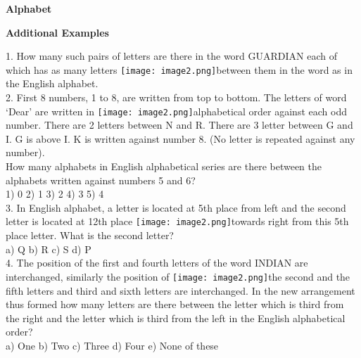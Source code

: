 \documentclass[
]{article}
\author{}
\date{}
\begin{document}
	
 

\begin{center}
	{\Large \textbf{Alphabet \\}}
\end{center}

{\large \textbf{ Additional Examples \\}}

1. How many such pairs of letters are there in the word GUARDIAN each of which has as many letters \texttt{[image: image2.png]}between them in the word as in the English alphabet.\\

2. First 8 numbers, 1 to 8, are written from top to bottom. The letters of word ‘Dear’ are written
in \texttt{[image: image2.png]}alphabetical order against each odd number. There are 2 letters between N and R. There
are 3 letter between G and I. G is above I. K is written against number 8. (No letter is
repeated against any number).\\
How many alphabets in English alphabetical series are there between the alphabets written
against numbers 5 and 6?\\
1) 0 \hspace{2mm}2) 1 \hspace{2mm}3) 2 \hspace{2mm}4) 3 \hspace{2mm}5) 4\\

3. In English alphabet, a letter is located at 5th place from left and the second letter is located at
12th place \texttt{[image: image2.png]}towards right from this 5th place letter. What is the second letter?\\
a) Q \hspace{2mm}b) R \hspace{2mm}c) S \hspace{2mm}d) P\\

4. The position of the first and fourth letters of the word INDIAN are interchanged, similarly
the position of \texttt{[image: image2.png]}the second and the fifth letters and third and sixth letters are interchanged. In
the new arrangement thus formed how many letters are there between the letter which is
third from the right and the letter which is third from the left in the English alphabetical
order?\\
a) One \hspace{2mm}b) Two \hspace{2mm}c) Three \hspace{2mm}d) Four \hspace{2mm}e) None of these\\
\end{document}
